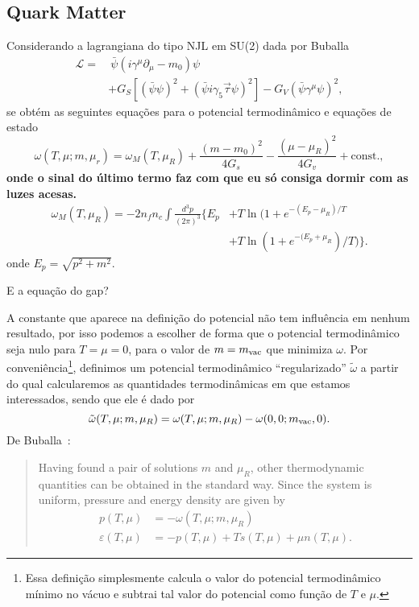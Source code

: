 \documentclass[prc, reprint, amsmath, linenumbers,10pt]{revtex4-1}
\begin{document}
\subsection{Quark Matter}

Considerando a lagrangiana do tipo NJL em SU(2) dada por Buballa\cite{Buballa1996}
\begin{equation}\label{Eq:LagNJL-SU2-Bub}
\begin{split}
	\mathcal{L} =&~ \bar{\psi}(i\gamma^\mu\partial_\mu - m_0)\psi \\
	&+ G_S[(\bar{\psi}\psi)^2 + (\bar{\psi}i\gamma_5\vec{\tau}\psi)^2] - G_V(\bar{\psi}\gamma^\mu \psi)^2,
\end{split}
\end{equation}
%
se obtém as seguintes equações para o potencial termodinâmico e equações de estado
	\begin{equation}\label{Eq:Pot_Termo_Temp_Finita}
		\omega(T, \mu; m, \mu_r) = \omega_M(T, \mu_R) + \frac{(m - m_0)^2}{4G_s} - \frac{(\mu - \mu_R)^2}{4G_v} + \textrm{const.},
	\end{equation}
%
\textbf{onde o sinal do último termo faz com que eu só consiga dormir com as luzes acesas.}
		\begin{equation}
	\begin{split}\label{Eq:Por_Termo_Temp_Finita_Fermi_Gas_Contrib}
		\omega_M(T, \mu_R) = -2 n_f n_c \int \frac{d^3p}{(2\pi)^3} \{E_p &+ T\ln(1+e^{-(E_p-\mu_R)/T} \\
		&+ T\ln(1 + e^{-(E_p+\mu_R})/T)\}.
	\end{split}
	\end{equation}
	onde $E_p = \sqrt{p^2 + m^2}$.
	
E a equação do gap?

A constante que aparece na definição do potencial não tem influência em nenhum resultado, por isso podemos a escolher de forma que o potencial termodinâmico seja nulo para $T = \mu = 0$, para o valor de $m = m_{\rm{vac}}$ que minimiza $\omega$. Por conveniência\footnote{Essa definição simplesmente calcula o valor do potencial termodinâmico mínimo no vácuo e subtrai tal valor do potencial como função de $T$ e $\mu$.}, definimos um potencial termodinâmico ``regularizado'' $\tilde\omega$ a partir do qual calcularemos as quantidades termodinâmicas em que estamos interessados, sendo que ele é dado por
\begin{equation}
	\tilde\omega(T, \mu; m, \mu_R) = \omega(T, \mu; m, \mu_R) - \omega(0, 0; m_{\rm{vac}}, 0).
\end{equation}
De Buballa~\cite{Buballa2005}:
\begin{quote}
	Having found a pair of solutions $m$ and $\mu_R$, other thermodynamic quantities can be obtained in the standard way. Since the system is uniform, pressure and energy density are given by
	\begin{align}
		p(T, \mu) &= -\omega(T, \mu; m, \mu_R) \label{Exp_pressao_T}\\
		\varepsilon(T, \mu) &= -p(T, \mu) + T s(T, \mu) + \mu n(T,\mu). \label{Exp_energia_T}
	\end{align}
\end{quote}
\end{document}

